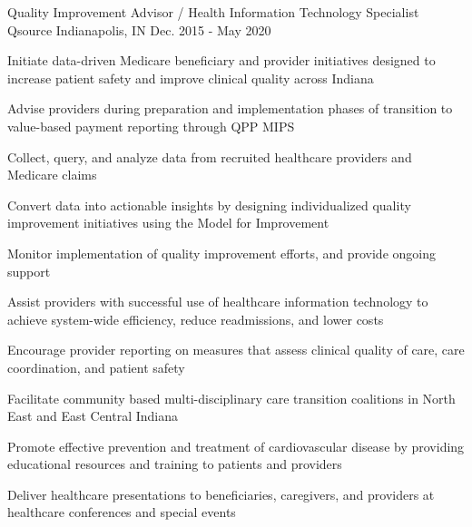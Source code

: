 \begin{cventries}
  \cventry
    {Quality Improvement Advisor / Health Information Technology Specialist} %
    {Qsource} %
    {Indianapolis, IN} %
    {Dec. 2015 - May 2020} %
    {
      \begin{cvitems} %
        \item {Initiate data-driven Medicare beneficiary and provider initiatives designed to increase patient safety and improve clinical quality across Indiana}
        \item {Advise providers during preparation and implementation phases of transition to value-based payment reporting through QPP MIPS}
        \item {Collect, query, and analyze data from recruited healthcare providers and Medicare claims}
        \item {Convert data into actionable insights by designing individualized quality improvement initiatives using the Model for Improvement}
        \item {Monitor implementation of quality improvement efforts, and provide ongoing support}
        \item {Assist providers with successful use of healthcare information technology to achieve system-wide efficiency, reduce readmissions, and lower costs}
        \item {Encourage provider reporting on measures that assess clinical quality of care, care coordination, and patient safety}
        \item {Facilitate community based multi-disciplinary care transition coalitions in North East and East Central Indiana}
        \item {Promote effective prevention and treatment of cardiovascular disease by providing educational resources and training to patients and providers}
        \item {Deliver healthcare presentations to beneficiaries, caregivers, and providers at healthcare conferences and special events}
  \end{cvitems}
    }


\end{cventries}
